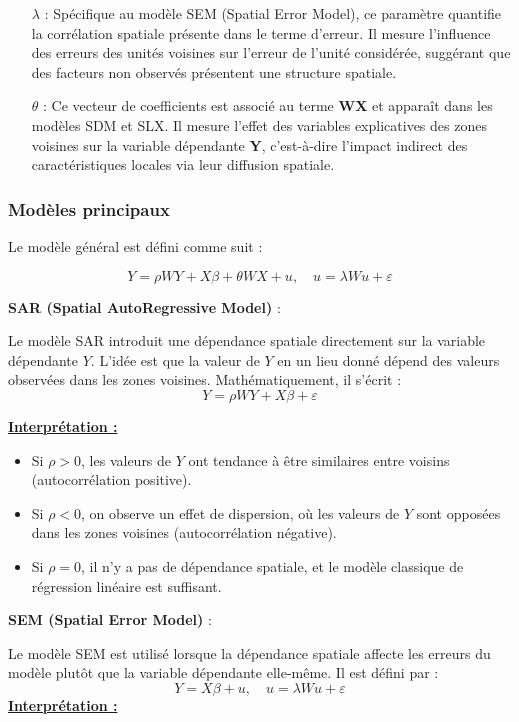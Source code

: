 \documentclass[
]{article}
\begin{document}
\begin{itemize}
\item[\(\lambda\)] : Spécifique au modèle SEM (Spatial Error Model), ce paramètre quantifie la corrélation spatiale présente dans le terme d'erreur. Il mesure l'influence des erreurs des unités voisines sur l'erreur de l'unité considérée, suggérant que des facteurs non observés présentent une structure spatiale.
\item[\(\theta\)] : Ce vecteur de coefficients est associé au terme \textbf{WX} et apparaît dans les modèles SDM et SLX. Il mesure l'effet des variables explicatives des zones voisines sur la variable dépendante \textbf{Y}, c'est-à-dire l'impact indirect des caractéristiques locales via leur diffusion spatiale.
\end{itemize}

\hypertarget{moduxe8les-principaux}{%
\subsubsection{Modèles principaux}\label{moduxe8les-principaux}}

Le modèle général est défini comme suit :

\[
Y = \rho W Y + X \beta + \theta W X + u, \quad u = \lambda W u + \varepsilon
\]

\textbf{SAR (Spatial AutoRegressive Model)} :

Le modèle SAR introduit une dépendance spatiale directement sur la
variable dépendante \(Y\). L'idée est que la valeur de \(Y\) en un lieu
donné dépend des valeurs observées dans les zones voisines.
Mathématiquement, il s'écrit : \[
Y = \rho W Y + X \beta + \varepsilon
\]

\underline{\textbf{Interprétation :}}

\begin{itemize}
\item Si \( \rho > 0 \), les valeurs de \( Y \) ont tendance à être similaires entre voisins (autocorrélation positive).
\item Si \( \rho < 0 \), on observe un effet de dispersion, où les valeurs de \( Y \) sont opposées dans les zones voisines (autocorrélation négative).
\item Si \( \rho = 0 \), il n’y a pas de dépendance spatiale, et le modèle classique de régression linéaire est suffisant.
\end{itemize}

\textbf{SEM (Spatial Error Model)} :

Le modèle SEM est utilisé lorsque la dépendance spatiale affecte les
erreurs du modèle plutôt que la variable dépendante elle-même. Il est
défini par : \[
Y = X \beta + u, \quad u = \lambda W u + \varepsilon
\] \underline{\textbf{Interprétation :}}
\end{document}
